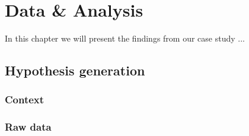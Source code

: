 \chapter{Data \& Analysis}
In this chapter we will present the findings from our case study ...

\section{Hypothesis generation}

\subsection{Context}
\subsection{Raw data}
\def\arraystretch{1.5}
